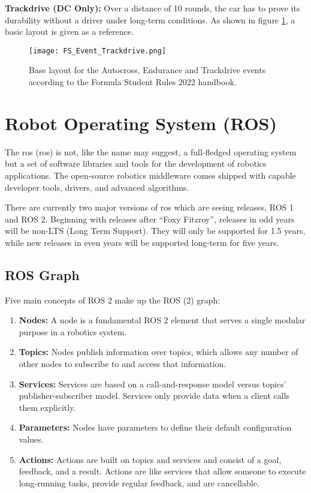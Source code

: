 \textbf{Trackdrive (DC Only):}  Over a distance of 10 rounds, the car has to prove its durability without a driver under long-term conditions. As shown in figure \ref{fig:FS Autocross, Endurance and Trackdrive layout}, a basic layout is given as a reference.
\begin{figure}[H]
    \centering
    \texttt{[image: FS\_Event\_Trackdrive.png]}
    \caption{Base layout for the Autocross, Endurance and Trackdrive events according to the Formula Student Rules 2022 handbook. \cite{fs_rules_2022_handbook}}
    \label{fig:FS Autocross, Endurance and Trackdrive layout}
\end{figure}

\section{Robot Operating System (ROS)} \label{sec:Robot Operating System (ROS)}
The \acrlong{ros} (\acrshort{ros}) is not, like the name may suggest, a full-fledged operating system but a set of software libraries and tools for the development of robotics applications. The open-source robotics middleware comes shipped with capable developer tools, drivers, and advanced algorithms. \cite{ros2_documentation}

There are currently two major versions of \acrshort{ros} which are seeing releases, ROS 1 and ROS 2. Beginning with releases after ``Foxy Fitzroy'', releases in odd years will be non-LTS (Long Term Support). They will only be supported for 1.5 years, while new releases in even years will be supported long-term for five years. \cite{ros2_documentation}

\subsection{ROS Graph} \label{sec:ROS Graph}
Five main concepts of ROS 2 make up the ROS (2) graph:
\begin{enumerate}
    \item \textbf{Nodes:} A node is a fundamental ROS 2 element that serves a single modular purpose in a robotics system. \cite{ros2_documentation}
    \item \textbf{Topics:} Nodes publish information over topics, which allows any number of other nodes to subscribe to and access that information. \cite{ros2_documentation}
    \item \textbf{Services:} Services are based on a call-and-response model versus topics’ publisher-subscriber model. Services only provide data when a client calls them explicitly. \cite{ros2_documentation}
    \item \textbf{Parameters:} Nodes have parameters to define their default configuration values. \cite{ros2_documentation}
    \item \textbf{Actions:} Actions are built on topics and services and consist of a goal, feedback, and a result. Actions are like services that allow someone to execute long-running tasks, provide regular feedback, and are cancellable. \cite{ros2_documentation}
\end{enumerate}

